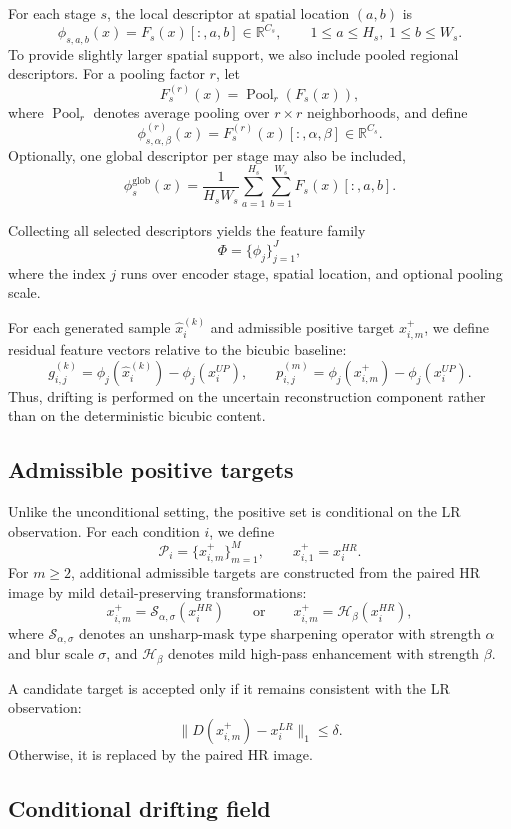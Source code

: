 \documentclass{article}
\begin{document}
For each stage \(s\), the local descriptor at spatial location \((a,b)\) is
\[
\phi_{s,a,b}(x)=F_s(x)[:,a,b]\in\mathbb{R}^{C_s},
\qquad
1\le a\le H_s,\;1\le b\le W_s.
\]
To provide slightly larger spatial support, we also include pooled regional descriptors. For a pooling factor \(r\), let
\[
F_s^{(r)}(x)=\operatorname{Pool}_r(F_s(x)),
\]
where \(\operatorname{Pool}_r\) denotes average pooling over \(r\times r\) neighborhoods, and define
\[
\phi^{(r)}_{s,\alpha,\beta}(x)=F_s^{(r)}(x)[:,\alpha,\beta]\in\mathbb{R}^{C_s}.
\]
Optionally, one global descriptor per stage may also be included,
\[
\phi_s^{\mathrm{glob}}(x)=\frac{1}{H_sW_s}\sum_{a=1}^{H_s}\sum_{b=1}^{W_s}F_s(x)[:,a,b].
\]

Collecting all selected descriptors yields the feature family
\[
\Phi=\{\phi_j\}_{j=1}^{J},
\]
where the index \(j\) runs over encoder stage, spatial location, and optional pooling scale.

For each generated sample \(\hat{x}_i^{(k)}\) and admissible positive target \(x_{i,m}^{+}\), we define residual feature vectors relative to the bicubic baseline:
\[
g_{i,j}^{(k)}=\phi_j(\hat{x}_i^{(k)})-\phi_j(x_i^{UP}),
\qquad
p_{i,j}^{(m)}=\phi_j(x_{i,m}^{+})-\phi_j(x_i^{UP}).
\]
Thus, drifting is performed on the uncertain reconstruction component rather than on the deterministic bicubic content.

\subsection{Admissible positive targets}

Unlike the unconditional setting, the positive set is conditional on the LR observation. For each condition \(i\), we define
\[
\mathcal{P}_i=\{x_{i,m}^{+}\}_{m=1}^{M},
\qquad
x_{i,1}^{+}=x_i^{HR}.
\]
For \(m\ge 2\), additional admissible targets are constructed from the paired HR image by mild detail-preserving transformations:
\[
x_{i,m}^{+} = \mathcal{S}_{\alpha,\sigma}(x_i^{HR})
\qquad\text{or}\qquad
x_{i,m}^{+} = \mathcal{H}_{\beta}(x_i^{HR}),
\]
where \(\mathcal{S}_{\alpha,\sigma}\) denotes an unsharp-mask type sharpening operator with strength \(\alpha\) and blur scale \(\sigma\), and \(\mathcal{H}_{\beta}\) denotes mild high-pass enhancement with strength \(\beta\).

A candidate target is accepted only if it remains consistent with the LR observation:
\[
\|D(x_{i,m}^{+})-x_i^{LR}\|_1 \le \delta.
\]
Otherwise, it is replaced by the paired HR image.

\subsection{Conditional drifting field}
\end{document}

